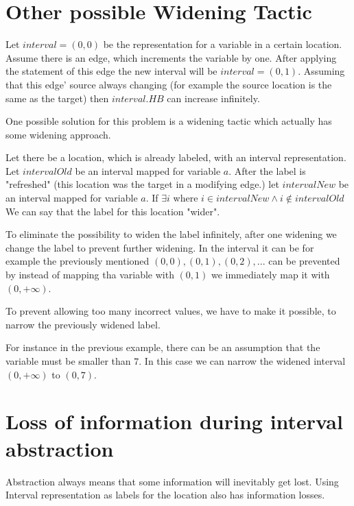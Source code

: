 \section{Other possible Widening Tactic}

Let $interval = (0,0)$ be the representation for a variable in a certain location. Assume there is an edge, which increments the variable by one. After applying the statement of this edge the new interval will be $interval = (0, 1)$. Assuming that this edge' source always changing (for example the source location is the same as the target) then $interval.HB$ can increase infinitely.

One possible solution for this problem is a widening tactic which actually has some widening approach.

Let there be a location, which is already labeled, with an interval representation. Let $intervalOld$ be an interval mapped for variable $a$. After the label is "refreshed" (this location was the target in a modifying edge.) let $intervalNew$ be an interval mapped for variable $a$. If $\exists i$ where $i \in intervalNew \land i \notin intervalOld$ We can say that the label for this location "wider".

To eliminate the possibility to widen the label infinitely, after one widening we change the label to prevent further widening. In the interval it can be for example the previously mentioned $(0, 0), (0,1), (0,2), ...$ can be prevented by instead of mapping tha variable with $(0,1)$ we immediately map it with $(0, +\infty)$.

To prevent allowing too many incorrect values, we have to make it possible, to narrow the previously widened label.

For instance in the previous example, there can be an assumption that the variable must be smaller than $7$. In this case we can narrow the widened interval $(0,+\infty)$ to $ (0, 7)$.


\section{Loss of information during interval abstraction}

Abstraction always means that some information will inevitably get lost. Using Interval representation as labels for the location also has information losses.

